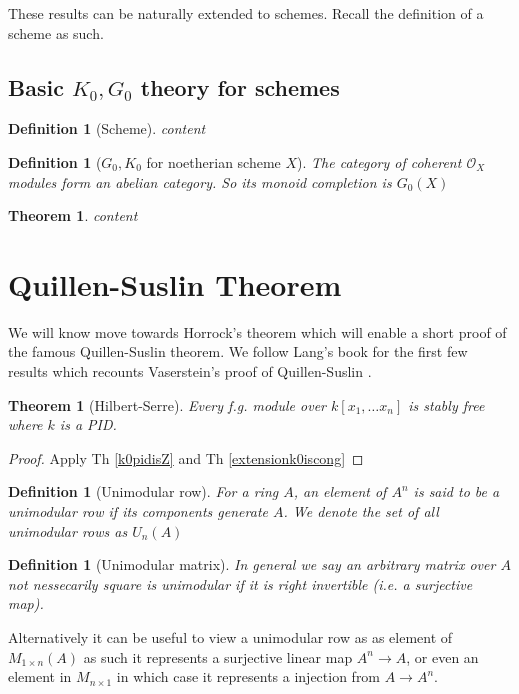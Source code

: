 \documentclass[12pt]{article}
\numberwithin{equation}{section}
\newcounter{dummy} \numberwithin{dummy}{section}
\newtheorem{theorem}[dummy]{Theorem}
\newtheorem{definition}[dummy]{Definition}
\newtheorem{lemma}[dummy]{Lemma}
\begin{document}
	These results can be naturally extended to schemes. Recall the definition of a scheme as such.
	\subsection{Basic $K_0, G_0$ theory for schemes}
	\begin{definition}[Scheme]
		content
	\end{definition}
	\begin{definition}[$G_0, K_0$ for noetherian scheme $X$]
		The category of coherent $\mathcal{O}_X$ modules form an abelian category. So its monoid completion is $G_0(X)$
	\end{definition}
	\begin{theorem}
		content
	\end{theorem}
%	
%		
	
	
	
	\section{Quillen-Suslin Theorem}
	We will know move towards Horrock's theorem which will enable a short proof of the famous Quillen-Suslin theorem. We follow Lang's book for the first few results which recounts Vaserstein's proof of Quillen-Suslin \cite{lang02}.
	
	
	\begin{theorem}[Hilbert-Serre]
	Every f.g. module over $k[x_1,\dots x_n]$ is stably free where $k$ is a PID.
	\end{theorem}
	\begin{proof}
		Apply Th \ref{k0pidisZ} and Th \ref{extensionk0iscong}
	\end{proof}
	
	
	\begin{definition}[Unimodular row]
		For a ring $A$, an element of $A^n$ is said to be a unimodular row if its components generate $A$. We denote the set of all unimodular rows as $U_n(A)$
	\end{definition}
	\begin{definition}[Unimodular matrix]
		In general we say an arbitrary matrix over $A$ not nessecarily square is unimodular if it is right invertible (i.e. a surjective map).
	\end{definition}
	Alternatively it can be useful to view a unimodular row as as element of $M_{1 \times n} (A) $ as such it represents a surjective linear map $A^n \to A$, or even an element in $M_{n \times 1}$ in which case it represents a injection from $A \to A^n$.
	
\end{document}

